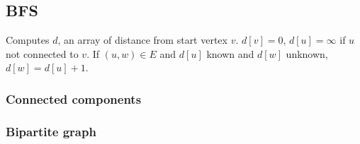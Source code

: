 \subsection{BFS}
Computes $d$, an array of distance from start vertex $v$.
$d[v]=0$, $d[u]=\infty$ if $u$ not connected to $v$. If $(u, w)\in E$ and $d[u]$ known and $d[w]$ unknown, $d[w] = d[u]+1$.\\


\subsubsection{Connected components}

\subsubsection{Bipartite graph}
